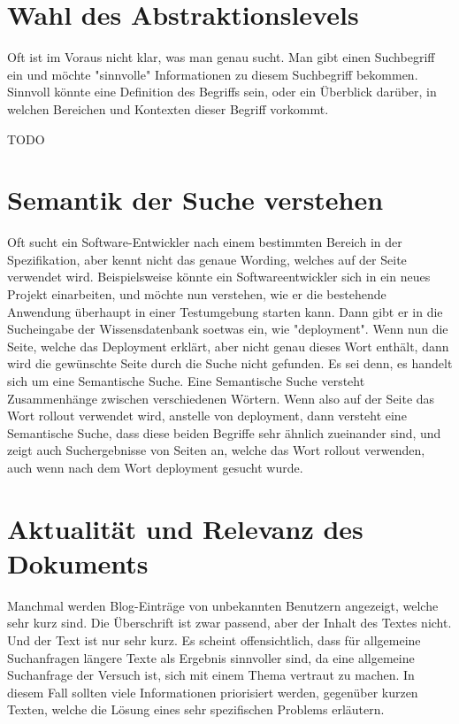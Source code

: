 \section{Wahl des Abstraktionslevels}
Oft ist im Voraus nicht klar, was man genau sucht. Man gibt einen Suchbegriff ein und möchte "sinnvolle" Informationen zu diesem Suchbegriff bekommen. Sinnvoll könnte eine Definition des Begriffs sein, oder ein Überblick darüber, in welchen Bereichen und Kontexten dieser Begriff vorkommt.

TODO

\section{Semantik der Suche verstehen}
\label{chap:semantik-der-suche-verstehen}
Oft sucht ein Software-Entwickler nach einem bestimmten Bereich in der Spezifikation, aber kennt nicht das genaue Wording, welches auf der Seite verwendet wird.
Beispielsweise könnte ein Softwareentwickler sich in ein neues Projekt einarbeiten, und möchte nun verstehen, wie er die bestehende Anwendung überhaupt in einer Testumgebung starten kann.
Dann gibt er in die Sucheingabe der Wissensdatenbank soetwas ein, wie "deployment".
Wenn nun die Seite, welche das Deployment erklärt, aber nicht genau dieses Wort enthält, dann wird die gewünschte Seite durch die Suche nicht gefunden.
Es sei denn, es handelt sich um eine Semantische Suche.
Eine Semantische Suche versteht Zusammenhänge zwischen verschiedenen Wörtern.
Wenn also auf der Seite das Wort rollout verwendet wird, anstelle von deployment, dann versteht eine Semantische Suche, dass diese beiden Begriffe sehr ähnlich zueinander sind, und zeigt auch Suchergebnisse von Seiten an, welche das Wort rollout verwenden, auch wenn nach dem Wort deployment gesucht wurde.

\section{Aktualität und Relevanz des Dokuments}
Manchmal werden Blog-Einträge von unbekannten Benutzern angezeigt, welche sehr kurz sind.
Die Überschrift ist zwar passend, aber der Inhalt des Textes nicht.
Und der Text ist nur sehr kurz.
Es scheint offensichtlich, dass für allgemeine Suchanfragen längere Texte als Ergebnis sinnvoller sind, da eine allgemeine Suchanfrage der Versuch ist, sich mit einem Thema vertraut zu machen.
In diesem Fall sollten viele Informationen priorisiert werden, gegenüber kurzen Texten, welche die Lösung eines sehr spezifischen Problems erläutern.\\

